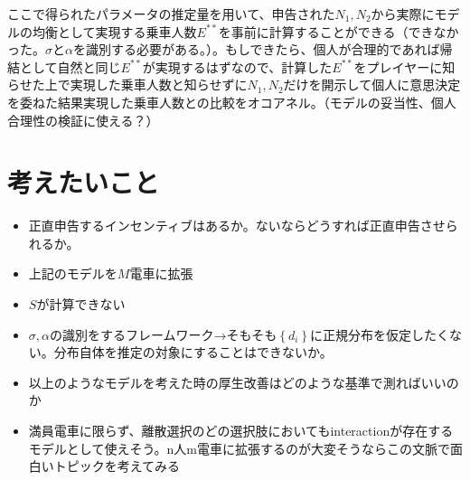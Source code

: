 \documentclass{jsarticle}
\begin{document}
ここで得られたパラメータの推定量を用いて、申告された$N_1, N_2$から実際にモデルの均衡として実現する乗車人数$E^{**}$を事前に計算することができる（できなかった。$\sigma$と$\alpha$を識別する必要がある。）。もしできたら、個人が合理的であれば帰結として自然と同じ$E^{**}$が実現するはずなので、計算した$E^{**}$をプレイヤーに知らせた上で実現した乗車人数と知らせずに$N_1, N_2$だけを開示して個人に意思決定を委ねた結果実現した乗車人数との比較をオコアネル。（モデルの妥当性、個人合理性の検証に使える？）


\section{考えたいこと}
\begin{itemize}
	\item 正直申告するインセンティブはあるか。ないならどうすれば正直申告させられるか。
	\item 上記のモデルを$M$電車に拡張
	\item $S$が計算できない
	\item $\sigma, \alpha$の識別をするフレームワーク→そもそも$\left\{d_i\right\}$に正規分布を仮定したくない。分布自体を推定の対象にすることはできないか。
	\item 以上のようなモデルを考えた時の厚生改善はどのような基準で測ればいいのか
	\item 満員電車に限らず、離散選択のどの選択肢においてもinteractionが存在するモデルとして使えそう。n人m電車に拡張するのが大変そうならこの文脈で面白いトピックを考えてみる
\end{itemize}
\end{document}
